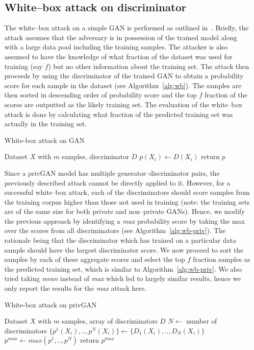 \documentclass{article}
\begin{document}
\subsection{White--box attack on discriminator}
The white--box attack on a simple GAN is performed as outlined in~\cite{hayes2019logan}. Briefly, the attack assumes that the adversary is in possession of the trained model along with a large data pool including the training samples. The attacker is also assumed to have the knowledge of what fraction of the dataset was used for training (say $f$) but no other information about the training set. The attack then proceeds by using the discriminator of the trained GAN to obtain a probability score for each sample in the dataset (see Algorithm~\ref{alg:wb}). The samples are then sorted in descending order of probability score and the top $f$ fraction of the scores are outputted as the likely training set. The evaluation of the white--box attack is done by calculating what fraction of the predicted training set was actually in the training set.
\begin{algorithm}
   \caption{White-box attack on GAN}
   \label{alg:wb}
\begin{algorithmic}
    Dataset $X$ with $m$ samples, discriminator $D$
   \STATE $p(X_i) \leftarrow D(X_i)$
   \ENDFOR
   \STATE return $p$
\end{algorithmic}
\end{algorithm}

Since a privGAN model has multiple generator--discriminator pairs, the previously described attack cannot be directly applied to it. However, for a successful white--box attack, each of the discriminators should score samples from the training corpus higher than those not used in training (note: the training sets are of the same size for both private and non--private GANs). Hence, we modify the previous approach by identifying a \textit{max} probability score by taking the max over the scores from all discriminators (see Algorithm~\ref{alg:wb-priv}). The rationale being that the discriminator which has trained on a particular data sample should have the largest discriminator score. We now proceed to sort the samples by each of these aggregate scores and select the top $f$ fraction samples as the predicted training set, which is similar to  Algorithm~\ref{alg:wb-priv}. We also tried taking \textit{mean} instead of \textit{max} which led to largely similar results, hence we only report the results for the \textit{max} attack here.  
\begin{algorithm}
   \caption{White-box attack on privGAN}
   \label{alg:wb-priv}
\begin{algorithmic}
    Dataset $X$ with $m$ samples, array of discriminators $D$
   \STATE $N \gets$ number of discriminators
   \STATE $\{p^1(X_i),..,p^N(X_i)\} \gets \{D_1(X_i),..,D_N(X_i)\}$
   \ENDFOR
\STATE $p^{max} \gets max(p^1,..,p^N)$
\STATE return $p^{max}$
\end{algorithmic}   
\end{algorithm}
\end{document}

